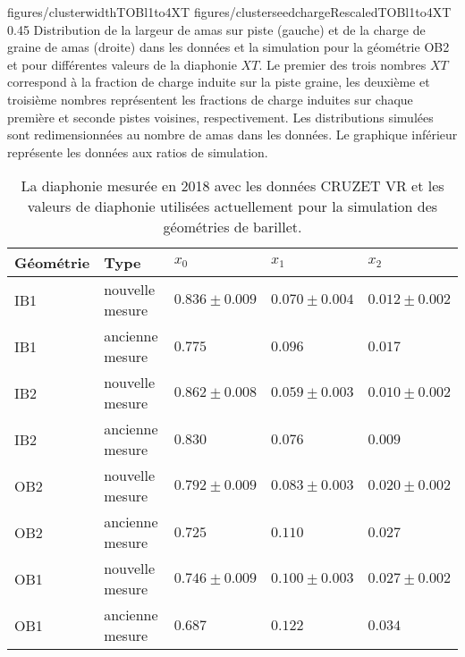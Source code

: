                  {figures/clusterwidthTOBl1to4XT}
                 {figures/clusterseedchargeRescaledTOBl1to4XT} %
                 {0.45}       %
                 {Distribution de la largeur de amas sur piste (gauche) et de la charge de graine de amas (droite) dans les données et la simulation pour la géométrie OB2 et pour différentes valeurs de la diaphonie $XT$. Le premier des trois nombres $XT$ correspond à la fraction de charge induite sur la piste graine, les deuxième et troisième nombres représentent les fractions de charge induites sur chaque première et seconde pistes voisines, respectivement. Les distributions simulées sont redimensionnées au nombre de amas dans les données. Le graphique inférieur représente les données aux ratios de simulation.}

\begin{table}[h]
\begin{center}
\begin{tabular}{|l|l|l|l|l|}
\hline
Géométrie & Type & $x_{0}$ & $x_{1}$ & $x_{2}$ \\
\hline
\hline
IB1 & nouvelle mesure & $ 0.836 \pm 0.009 $ & $0.070 \pm 0.004 $ & $0.012 \pm 0.002 $ \\
IB1 & ancienne mesure & $ 0.775 $ & $ 0.096 $ & $0.017 $  \\
\hline
IB2 &  nouvelle mesure & $0.862 \pm 0.008 $ & $0.059 \pm 0.003 $ & $0.010 \pm  0.002 $  \\
IB2 &  ancienne mesure &  $0.830 $ & $0.076 $ & $ 0.009$   \\
\hline
OB2 &  nouvelle mesure & $0.792 \pm 0.009 $ & $0.083 \pm 0.003 $ & $0.020 \pm 0.002$  \\
OB2 &  ancienne mesure &   $0.725 $ & $0.110 $ & $ 0.027 $  \\
\hline
OB1 &  nouvelle mesure &  $0.746 \pm 0.009 $ & $0.100 \pm 0.003 $ & $0.027 \pm 0.002 $  \\
OB1 &  ancienne mesure &  $0.687 $ & $0.122 $ & $ 0.034 $ \\
\hline
\end{tabular}
\caption[Table caption text]{La diaphonie mesurée en 2018 avec les données CRUZET VR et les valeurs de diaphonie utilisées actuellement pour la simulation des géométries de barillet. }
\label{tab:measuredXtalk2}
\end{center}
\end{table}

